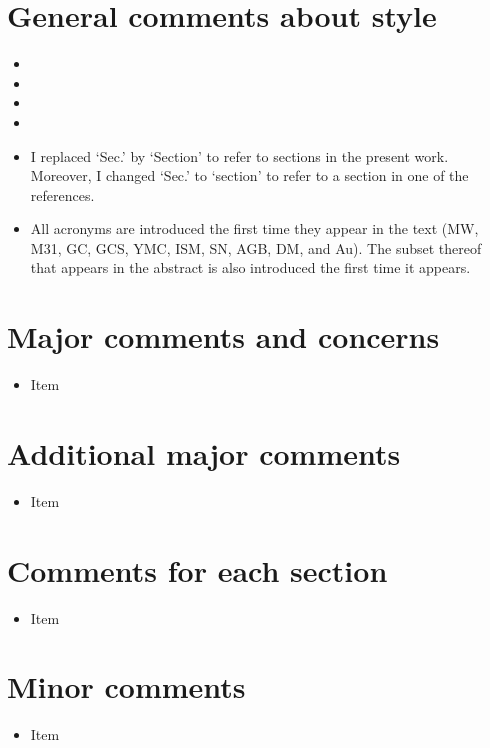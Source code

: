 \documentclass{article}
\begin{document}
\section*{General comments about style}
\begin{itemize}
\item
\item
\item
\item
\item I replaced `Sec.' by `Section' to refer to sections in the present work.
Moreover, I changed `Sec.' to `section' to refer to a section in one of the references.
\item All acronyms are introduced the first time they appear in the text
(MW, M31, GC, GCS, YMC, ISM, SN, AGB, DM, and Au). The subset thereof that appears 
in the abstract is also introduced the first time it appears.
\end{itemize}


\section*{Major comments and concerns}
\begin{itemize}
\item Item
\end{itemize}


\section*{Additional major comments}
\begin{itemize}
\item Item
\end{itemize}


\section*{Comments for each section}
\begin{itemize}
\item Item
\end{itemize}



\section*{Minor comments}
\begin{itemize}
\item Item
\end{itemize}
\end{document}
